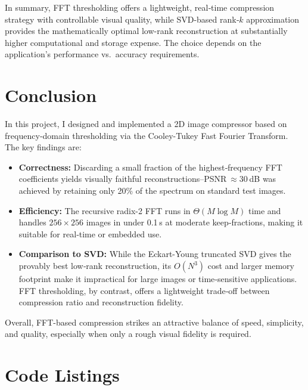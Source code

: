 \documentclass[12pt]{article}
\begin{document}
\noindent In summary, FFT thresholding offers a lightweight, real‐time compression strategy with controllable visual quality, while SVD-based rank‐$k$ approximation provides the mathematically optimal low-rank reconstruction at substantially higher computational and storage expense.  The choice depends on the application’s performance vs.\ accuracy requirements.

\section{Conclusion}
In this project, I designed and implemented a 2D image compressor based on frequency‐domain thresholding via the Cooley-Tukey Fast Fourier Transform.  The key findings are:

\begin{itemize}
  \item \textbf{Correctness:}  Discarding a small fraction of the highest‐frequency FFT coefficients yields visually faithful reconstructions--PSNR $\approx30$ dB was achieved by retaining only 20\% of the spectrum on standard test images.
  \item \textbf{Efficiency:}  The recursive radix-2 FFT runs in $\Theta(M\log M)$ time and handles $256\times256$ images in under 0.1 s at moderate keep‐fractions, making it suitable for real‐time or embedded use.
  \item \textbf{Comparison to SVD:}  While the Eckart-Young truncated SVD gives the provably best low‐rank reconstruction, its $O(N^3)$ cost and larger memory footprint make it impractical for large images or time‐sensitive applications.  FFT thresholding, by contrast, offers a lightweight trade‐off between compression ratio and reconstruction fidelity.
\end{itemize}

\noindent Overall, FFT-based compression strikes an attractive balance of speed, simplicity, and quality, especially when only a rough visual fidelity is required.  


\appendix
\section{Code Listings}




\end{document}
